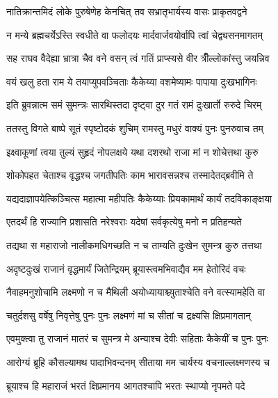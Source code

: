 \twolineshloka
{नातिक्रान्तमिदं लोके पुरुषेणेह केनचित्}
{तव सभ्रातृभार्यस्य वासः प्राकृतवद्वने} %

\twolineshloka
{न मन्ये ब्रह्मचर्येऽस्ति स्वधीते वा फलोदयः}
{मार्दवार्जवयोर्वापि त्वां चेद्व्यसनमागतम्} %

\twolineshloka
{सह राघव वैदेह्या भ्रात्रा चैव वने वसन्}
{त्वं गतिं प्राप्स्यसे वीर त्रीँल्लोकांस्तु जयन्निव} %

\twolineshloka
{वयं खलु हता राम ये तयाप्युपवञ्चिताः}
{कैकेय्या वशमेष्यामः पापाया दुःखभागिनः} %

\twolineshloka
{इति ब्रुवन्नात्म समं सुमन्त्रः सारथिस्तदा}
{दृष्ट्वा दुर गतं रामं दुःखार्तो रुरुदे चिरम्} %

\twolineshloka
{ततस्तु विगते बाष्पे सूतं स्पृष्टोदकं शुचिम्}
{रामस्तु मधुरं वाक्यं पुनः पुनरुवाच तम्} %

\twolineshloka
{इक्ष्वाकूणां त्वया तुल्यं सुहृदं नोपलक्षये}
{यथा दशरथो राजा मां न शोचेत्तथा कुरु} %

\twolineshloka
{शोकोपहत चेताश्च वृद्धश्च जगतीपतिः}
{काम भारावसन्नश्च तस्मादेतद्ब्रवीमि ते} %

\twolineshloka
{यद्यदाज्ञापयेत्किञ्चित्स महात्मा महीपतिः}
{कैकेय्याः प्रियकामार्थं कार्यं तदविकाङ्क्षया} %

\twolineshloka
{एतदर्थं हि राज्यानि प्रशासति नरेश्वराः}
{यदेषां सर्वकृत्येषु मनो न प्रतिहन्यते} %

\twolineshloka
{तद्यथा स महाराजो नालीकमधिगच्छति}
{न च ताम्यति दुःखेन सुमन्त्र कुरु तत्तथा} %

\twolineshloka
{अदृष्टदुःखं राजानं वृद्धमार्यं जितेन्द्रियम्}
{ब्रूयास्त्वमभिवाद्यैव मम हेतोरिदं वचः} %

\twolineshloka
{नैवाहमनुशोचामि लक्ष्मणो न च मैथिली}
{अयोध्यायाश्च्युताश्चेति वने वत्स्यामहेति वा} %

\twolineshloka
{चतुर्दशसु वर्षेषु निवृत्तेषु पुनः पुनः}
{लक्ष्मणं मां च सीतां च द्रक्ष्यसि क्षिप्रमागतान्} %

\twolineshloka
{एवमुक्त्वा तु राजानं मातरं च सुमन्त्र मे}
{अन्याश्च देवीः सहिताः कैकेयीं च पुनः पुनः} %

\twolineshloka
{आरोग्यं ब्रूहि कौसल्यामथ पादाभिवन्दनम्}
{सीताया मम चार्यस्य वचनाल्लक्ष्मणस्य च} %

\twolineshloka
{ब्रूयाश्च हि महाराजं भरतं क्षिप्रमानय}
{आगतश्चापि भरतः स्थाप्यो नृपमते पदे} %

